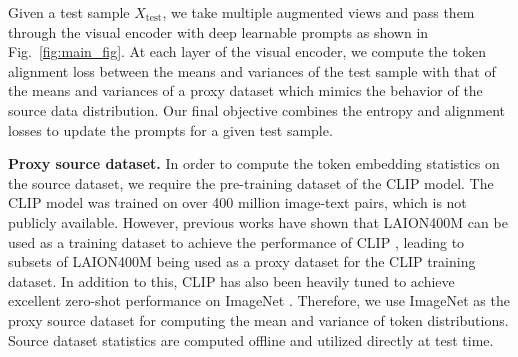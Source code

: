 \documentclass[a4paper]{article}
\begin{document}
Given a test sample $X_{\text{test}}$, we take multiple augmented views and pass them through the visual encoder with deep learnable prompts as shown in Fig.~\ref{fig:main_fig}. At each layer of the visual encoder, we compute the token alignment loss between the means and variances of the test sample with that of the means and variances of a proxy dataset which mimics the behavior of the source data distribution. Our final objective combines the entropy and alignment losses to update the prompts for a given test sample.

\textbf{Proxy source dataset.} In order to compute the token embedding statistics on the source dataset, we require the pre-training dataset of the CLIP model. The CLIP model was trained on over 400 million image-text pairs, which is not publicly available. However, previous works have shown that LAION400M \cite{schuhmann2021laion} can be used as a training dataset to achieve the performance of CLIP \cite{cherti2022reproducible}, leading to subsets of LAION400M being used as a proxy dataset for the CLIP training dataset. In addition to this, CLIP has also been heavily tuned to achieve excellent zero-shot performance on ImageNet \cite{bahng2022exploring}. Therefore, we use ImageNet as the proxy source dataset for computing the mean and variance of token distributions. Source dataset statistics are computed offline and utilized directly at test time.

\end{document}
